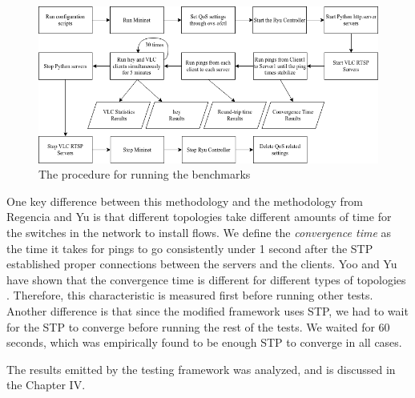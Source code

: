 \begin{figure}
    \centering
    \includegraphics[width=\textwidth]{Figures/Test Procedure.drawio.png}
    \caption{The procedure for running the benchmarks}
    \label{fig:benchmark}
\end{figure}

One key difference between this methodology and the methodology from Regencia and Yu is that different topologies take different amounts of time for the switches in the network to install flows. We define the \textit{convergence time} as the time it takes for pings to go consistently under 1 second after the STP established proper connections between the servers and the clients. Yoo and Yu have shown that the convergence time is different for different types of topologies \cite{yoo_building_2022}. Therefore, this characteristic is measured first before running other tests. Another difference is that since the modified framework uses STP, we had to wait for the STP to converge before running the rest of the tests. We waited for 60 seconds, which was empirically found to be enough STP to converge in all cases.

The results emitted by the testing framework was analyzed, and is discussed in the Chapter IV.
